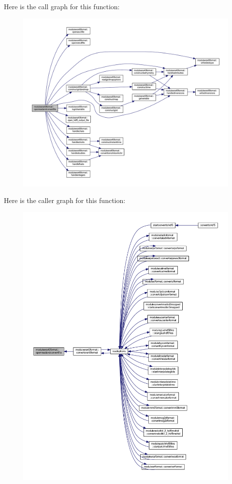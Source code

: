 Here is the call graph for this function\+:\nopagebreak
\begin{figure}[H]
\begin{center}
\leavevmode
\includegraphics[width=350pt]{namespacemoduleera40format_ab03a5122cb83fd0b3153870ed6bf1cdc_cgraph}
\end{center}
\end{figure}
Here is the caller graph for this function\+:\nopagebreak
\begin{figure}[H]
\begin{center}
\leavevmode
\includegraphics[width=350pt]{namespacemoduleera40format_ab03a5122cb83fd0b3153870ed6bf1cdc_icgraph}
\end{center}
\end{figure}
